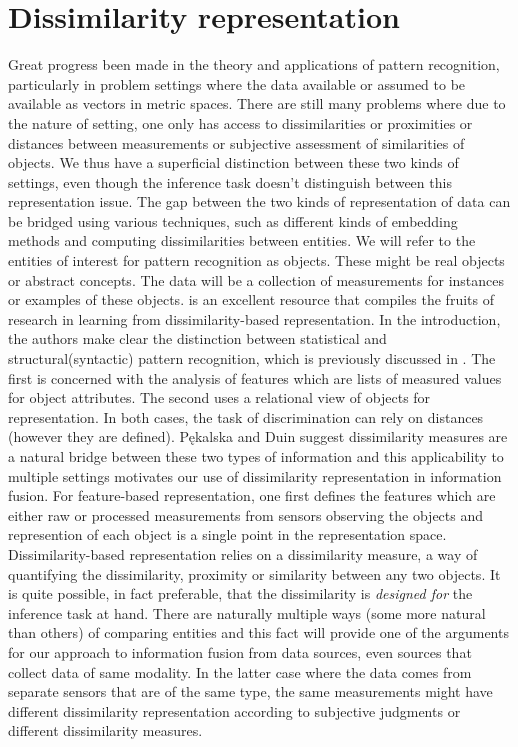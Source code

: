 \documentclass[12pt,oneside,final]{thesis}\usepackage[]{graphicx}\usepackage[]{color}
\begin{document}
\section{Dissimilarity representation}
 Great progress been made in the theory and applications of pattern recognition, particularly in problem settings where the data available or assumed to be available as vectors in metric spaces. There are still many problems where due to the nature of setting, one only has access to dissimilarities or  proximities or distances between measurements or subjective assessment  of similarities of objects. We thus have a superficial distinction between these two kinds of settings, even though the inference task doesn't distinguish between this representation issue. The gap between the two kinds of representation of data can be bridged using various  techniques, such as different kinds of embedding methods and computing dissimilarities between entities.
We will refer to the entities of interest for pattern recognition as objects. These might be real objects or abstract concepts. The data will be a collection of measurements for instances or examples of these objects.
 \cite{Duin} is an excellent resource that compiles the fruits of research in learning from  dissimilarity-based representation. In the introduction, the authors make clear the distinction between statistical and structural(syntactic) pattern recognition, which is previously discussed in \cite{NadlerSmith1993}. The first is concerned with the analysis of features which are lists of measured values for object attributes. The second uses a relational view of objects for representation. In both cases,  the task of discrimination  can rely on distances (however they are defined). P\k{e}kalska and Duin  suggest dissimilarity measures  are a natural bridge between these two types of information and this applicability to  multiple settings motivates our use of dissimilarity representation in information fusion. 
For feature-based representation, one first defines the features which are either raw or processed measurements from sensors observing the objects and  represention of each object is a single point in the representation space. Dissimilarity-based representation relies on a dissimilarity measure, a way of quantifying the dissimilarity, proximity or similarity between any two objects. It is quite possible, in fact preferable, that the dissimilarity is \emph{designed for} the inference task at hand. 
There are naturally multiple ways (some more natural than others) of comparing entities and this fact will provide one of the arguments for our approach to information fusion from  data sources, even sources that collect  data of same modality. In  the latter case where the data comes from separate sensors that are of the same type, the same measurements might have different dissimilarity representation according to subjective judgments or different dissimilarity  measures. 
\end{document}
